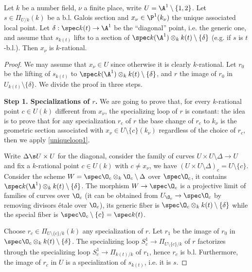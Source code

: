 \begin{proposition}
\notready\label{simple}
	Let $k$ be a number field, $\nu$ a finite place, write $U=\A^{1}\setminus\{1,2\}$. Let $s\in\Pi_{U/k}(k)$ be a b.l. Galois section and $x_{\nu}\in\P^{1}(k_{\nu})$ the unique associated local point. Let $\delta:\spec k(t)\to\A^{1}$ be the ``diagonal''	 point, i.e. the generic one, and assume that $s_{k(t)}$ lifts to a section of $\spec k(\A^{1})\otimes_{k} k(t)\setminus\{\delta\}$ (e.g. if $s$ is $t$-b.l.). Then $x_{\nu}$ is $k$-rational.
	\begin{proof}
		We may assume that $x_{\nu}\in U$ since otherwise it is clearly $k$-rational. Let $r_{0}$ be the lifting of $s_{k(t)}$ to $\spec k(\A^{1})\otimes_{k} k(t)\setminus\{\delta\}$, and $r$ the image of $r_{0}$ in $U_{k(t)}\setminus \{\delta\}$. We divide the proof in three steps.

		\textbf{Step 1. Specializations of $r$.} We are going to prove that, for every $k$-rational point $c\in U(k)$ different from $x_{\nu}$, the specializing loop of $r$ is constant: the idea is to prove that for any specialization $r_{c}$ of $r$ the base change of $r_{c}$ to $k_{\nu}$ is the geometric section associated with $x_{\nu}\in U\setminus\{c\}(k_{\nu})$ regardless of the choice of $r_{c}$, then we apply \autoref{uniqueloop1}.

		Write $\Delta\s U\times U$ for the diagonal, consider the family of curves $U\times U\setminus \Delta\to U$ and fix a $k$-rational point $c\in U(k)$ with $c\neq x_{\nu}$, we have $(U\times U\setminus \Delta)_{c}=U\setminus\{c\}$. Consider the scheme $W=\spec\O_{c}\otimes_{k}\O_{c}\setminus\Delta$ over $\spec \O_{c}$, it contains $\spec k(\A^{1})\otimes_{k} k(t)\setminus\{\delta\}$. The morphism $W\to\spec\O_{c}$ is a projective limit of families of curves over $\O_{c}$ (it can be obtained from $U_{\O_{c}}\to\spec \O_{c}$ by removing divisors étale over $\O_{c}$), its generic fiber is $\spec \O_{c}\otimes_{k} k(t)\setminus\{\delta\}$ while the special fiber is $\spec\O_{c}\setminus\{c\}=\spec k(t)$.

		Choose $r_{c}\in\Pi_{U\setminus\{c\}/k}(k)$ any specialization of $r$. Let $r_{1}$ be the image of $r_{0}$ in $\spec \O_{c}\otimes_{k} k(t)\setminus\{\delta\}$. The specializing loop $S^{1}_{c}\to\Pi_{U\setminus\{c\}/k}$ of $r$ factorizes through the specializing loop $S^{1}_{c}\to\Pi_{k(t)/k}$ of $r_{1}$, hence $r_{c}$ is b.l. Furthermore, the image of $r_{c}$ in $U$ is a specialization of $s_{k(t)}$, i.e. it is $s$.


\end{proof}
\end{proposition}
